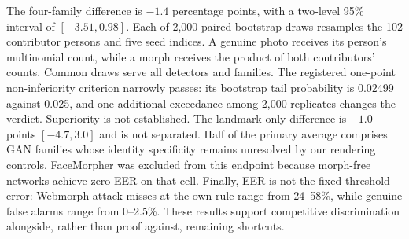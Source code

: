     The four-family difference is $-1.4$ percentage points, with a two-level 95\% interval of $[-3.51,0.98]$. Each of 2,000 paired bootstrap draws resamples the 102 contributor persons and five seed indices. A genuine photo receives its person's multinomial count, while a morph receives the product of both contributors' counts. Common draws serve all detectors and families. The registered one-point non-inferiority criterion narrowly passes: its bootstrap tail probability is 0.02499 against 0.025, and one additional exceedance among 2,000 replicates changes the verdict. Superiority is not established. The landmark-only difference is $-1.0$ points $[-4.7,3.0]$ and is not separated. Half of the primary average comprises GAN families whose identity specificity remains unresolved by our rendering controls. FaceMorpher was excluded from this endpoint because morph-free networks achieve zero EER on that cell. Finally, EER is not the fixed-threshold error: Webmorph attack misses at the own rule range from 24--58\%, while genuine false alarms range from 0--2.5\%. These results support competitive discrimination alongside, rather than proof against, remaining shortcuts.
    
